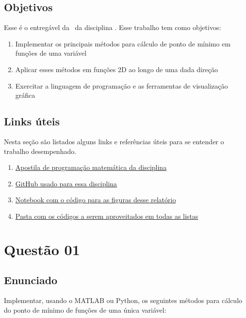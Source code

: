 \documentclass[10pt, a4paper]{article}
\begin{document}
\subsection{Objetivos}

Esse é o entregável da \TITLE \ da disciplina \DISCIPLINE. Esse trabalho tem como objetivos:

\begin{enumerate}
  \item Implementar os principais métodos para cálculo de ponto de mínimo em funções de uma variável
  \item Aplicar esses métodos em funções 2D ao longo de uma dada direção
  \item Exercitar a linguagem de programação e as ferramentas de visualização gráfica
\end{enumerate}

\subsection{Links úteis}\label{links}

Nesta seção são listados alguns links e referências úteis para se entender o trabalho desempenhado.

\begin{enumerate}
  \item \href{https://web.tecgraf.puc-rio.br/~ivan/MEC2403/ProgMatematica_VazPereiraMenezes-Ago2012.pdf}{Apostila de programação matemática da disciplina}
  \item \href{https://github.com/prj-phcp/MEC2403_Activities}{GitHub usado para essa disciplina}
  \item \href{https://github.com/prj-phcp/MEC2403_Activities/blob/master/Lista1/Lista1.ipynb}{Notebook com o código para as figuras desse relatório}
  \item \href{https://github.com/prj-phcp/MEC2403_Activities/blob/master/packages}{Pasta com os códigos a serem aproveitados em todas as listas}
\end{enumerate}

\section{Questão 01}\label{sec:q01}

\subsection{Enunciado}

Implementar, usando o MATLAB ou Python, os seguintes métodos para cálculo do ponto
de mínimo de funções de uma única variável:
\end{document}
